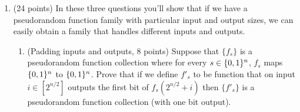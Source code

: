 \documentclass{article}
\begin{document}
\begin{enumerate}[,start=4]%

\item{}
(24 points) In these three questions you'll show that if we have
a pseudorandom function family with particular input and output sizes, we can easily obtain a
family that handles different inputs and outputs.%

\begin{enumerate}[noitemsep,topsep=\mdcompacttopsep,label=\alph*.]%

\item{}(Padding inputs and outputs, 8 points) Suppose that $\{ f_s \}$ is a pseudorandom function collection where for every $s\in\{0,1\}^n$, $f_s$ maps   $\{0,1\}^n$ to $\{0,1\}^n$. Prove that if we define $f'_s$ to be function that on input $i\in [2^{n/2}]$ outputs the first bit of $f_s(2^{n/2}+i)$ then $\{ f'_s \}$ is a pseudorandom function collection (with one bit output).


\end{enumerate}
\end{enumerate}
\end{document}
